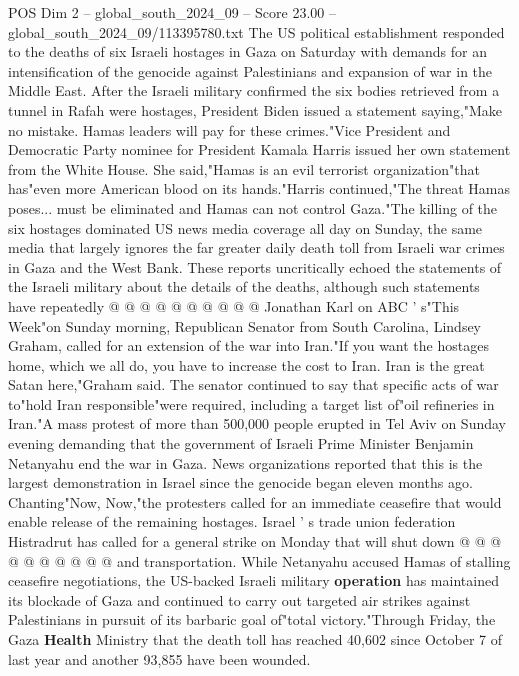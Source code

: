 \begin{textsample}{POS Dim 2 – global\_south\_2024\_09 – Score 23.00 – global\_south\_2024\_09/113395780.txt}  \label{ex:f2_pos_199}
The US political establishment responded to the deaths of six Israeli hostages in Gaza on Saturday with demands for an intensification of the genocide against Palestinians and expansion of war in the Middle East.
After the Israeli military confirmed the six bodies retrieved from a tunnel in Rafah were hostages, President Biden issued a statement saying,"Make no mistake.
Hamas leaders will pay for these crimes."Vice President and Democratic Party nominee for President Kamala Harris issued her own statement from the White House.
She said,"Hamas is an evil terrorist organization"that has"even more American blood on its hands."Harris continued,"The threat Hamas poses... must be eliminated and Hamas can not control Gaza."The killing of the six hostages dominated US news media coverage all day on Sunday, the same media that largely ignores the far greater daily death toll from Israeli war crimes in Gaza and the West Bank.
These reports uncritically echoed the statements of the Israeli military about the details of the deaths, although such statements have repeatedly @ @ @ @ @ @ @ @ @ @ Jonathan Karl on ABC ' s"This Week"on Sunday morning, Republican Senator from South Carolina, Lindsey Graham, called for an extension of the war into Iran."If you want the hostages home, which we all do, you have to increase the cost to Iran.
Iran is the great Satan here,"Graham said.
The senator continued to say that specific acts of war to"hold Iran responsible"were required, including a target list of"oil refineries in Iran."A mass protest of more than 500,000 people erupted in Tel Aviv on Sunday evening demanding that the government of Israeli Prime Minister Benjamin Netanyahu end the war in Gaza.
News organizations reported that this is the largest demonstration in Israel since the genocide began eleven months ago.
Chanting"Now, Now,"the protesters called for an immediate ceasefire that would enable release of the remaining hostages.
Israel ' s trade union federation Histradrut has called for a general strike on Monday that will shut down @ @ @ @ @ @ @ @ @ @ and transportation.
While Netanyahu accused Hamas of stalling ceasefire negotiations, the US-backed Israeli military \textbf{operation} has maintained its blockade of Gaza and continued to carry out targeted air strikes against Palestinians in pursuit of its barbaric goal of"total victory."Through Friday, the Gaza \textbf{Health} Ministry that the death toll has reached 40,602 since October 7 of last year and another 93,855 have been wounded.

\end{textsample}

